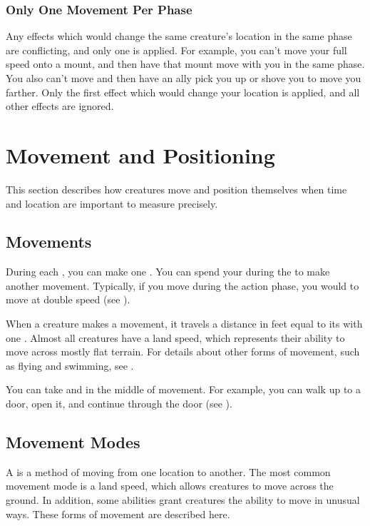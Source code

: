     \subsubsection{Only One Movement Per Phase}\label{Only One Movement Per Phase}
      Any effects which would change the same creature's location in the same phase are conflicting, and only one is applied.
      For example, you can't move your full speed onto a mount, and then have that mount move with you in the same phase.
      You also can't move and then have an ally pick you up or shove you to move you farther.
      Only the first effect which would change your location is applied, and all other effects are ignored.

\section{Movement and Positioning}\label{Movement and Positioning}
  This section describes how creatures move and position themselves when time and location are important to measure precisely.

  \subsection{Movements}\label{Movements}
    During each , you can make one .
    You can spend your  during the  to make another movement.
    Typically, if you move during the action phase, you would  to move at double speed (see ).

    When a creature makes a movement, it travels a distance in feet equal to its  with one .
    Almost all creatures have a land speed, which represents their ability to move across mostly flat terrain.
    For details about other forms of movement, such as flying and swimming, see .

    You can take  and  in the middle of movement.
    For example, you can walk up to a door, open it, and continue through the door (see ).

  \subsection{Movement Modes}\label{Movement Modes}
    A  is a method of moving from one location to another.
    The most common movement mode is a land speed, which allows creatures to move across the ground.
    In addition, some abilities grant creatures the ability to move in unusual ways.
    These forms of movement are described here.

